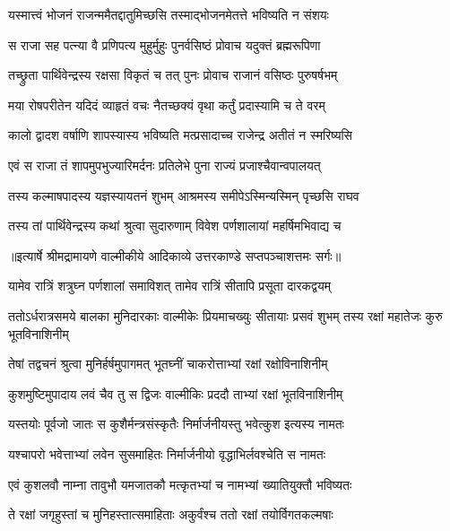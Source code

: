 \twolineshloka
{यस्मात्त्वं भोजनं राजन्ममैतद्दातुमिच्छसि}
{तस्माद्भोजनमेतत्ते भविष्यति न संशयः} %

\twolineshloka
{स राजा सह पत्न्या वै प्रणिपत्य मुहुर्मुहुः}
{पुनर्वसिष्ठं प्रोवाच यदुक्तं ब्रह्मरूपिणा} %

\twolineshloka
{तच्छ्रुता पार्थिवेन्द्रस्य रक्षसा विकृतं च तत्}
{पुनः प्रोवाच राजानं वसिष्ठः पुरुषर्षभम्} %

\twolineshloka
{मया रोषपरीतेन यदिदं व्याहृतं वचः}
{नैतच्छक्यं वृथा कर्तुं प्रदास्यामि च ते वरम्} %

\twolineshloka
{कालो द्वादश वर्षाणि शापस्यास्य भविष्यति}
{मत्प्रसादाच्च राजेन्द्र अतीतं न स्मरिष्यसि} %

\twolineshloka
{एवं स राजा तं शापमुपभुज्यारिमर्दनः}
{प्रतिलेभे पुना राज्यं प्रजाश्चैवान्वपालयत्} %

\twolineshloka
{तस्य कल्माषपादस्य यज्ञस्यायतनं शुभम्}
{आश्रमस्य समीपेऽस्मिन्यस्मिन् पृच्छसि राघव} %

\twolineshloka
{तस्य तां पार्थिवेन्द्रस्य कथां श्रुत्वा सुदारुणाम्}
{विवेश पर्णशालायां महर्षिमभिवाद्य च} %


{॥इत्यार्षे श्रीमद्रामायणे वाल्मीकीये आदिकाव्ये उत्तरकाण्डे सप्तपञ्चाशत्तमः सर्गः॥}


\twolineshloka
{यामेव रात्रिं शत्रुघ्न पर्णशालां समाविशत्}
{तामेव रात्रिं सीतापि प्रसूता दारकद्वयम्} %

\threelineshloka
{ततोऽर्धरात्रसमये बालका मुनिदारकाः}
{वाल्मीकेः प्रियमाचख्युः सीतायाः प्रसवं शुभम्}
{तस्य रक्षां महातेजः कुरु भूतविनाशिनीम्} %

\twolineshloka
{तेषां तद्वचनं श्रुत्वा मुनिर्हर्षमुपागमत्}
{भूतघ्नीं चाकरोत्ताभ्यां रक्षां रक्षोविनाशिनीम्} %

\twolineshloka
{कुशमुष्टिमुपादाय लवं चैव तु स द्विजः}
{वाल्मीकिः प्रददौ ताभ्यां रक्षां भूतविनाशिनीम्} %

\twolineshloka
{यस्तयोः पूर्वजो जातः स कुशैर्मन्त्रसंस्कृतैः}
{निर्मार्जनीयस्तु भवेत्कुश इत्यस्य नामतः} %

\twolineshloka
{यश्चापरो भवेत्ताभ्यां लवेन सुसमाहितः}
{निर्मार्जनीयो वृद्धाभिर्लवश्चेति स नामतः} %

\twolineshloka
{एवं कुशलवौ नाम्ना तावुभौ यमजातकौ}
{मत्कृतभ्यां च नामभ्यां ख्यातियुक्तौ भविष्यतः} %

\twolineshloka
{ते रक्षां जगृहुस्तां च मुनिहस्तात्समाहिताः}
{अकुर्वंश्च ततो रक्षां तयोर्विगतकल्मषाः} %

